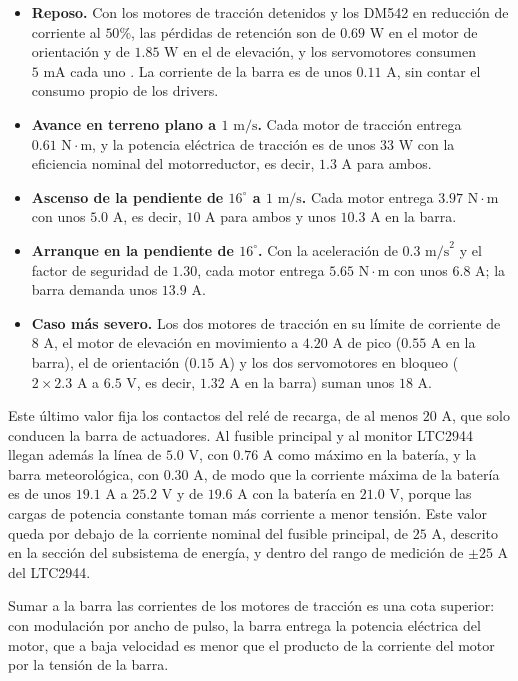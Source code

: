 \documentclass[../../General.tex]{subfiles}
\begin{document}
\begin{itemize}
    \item \textbf{Reposo.} Con los motores de tracción detenidos y los DM542 en reducción de corriente al $50\%$, las pérdidas de retención son de $0.69\text{ W}$ en el motor de orientación y de $1.85\text{ W}$ en el de elevación, y los servomotores consumen $5\text{ mA}$ cada uno \citep{dsservo_rds3225}. La corriente de la barra es de unos $0.11\text{ A}$, sin contar el consumo propio de los drivers.
    \item \textbf{Avance en terreno plano a $1\text{ m/s}$.} Cada motor de tracción entrega $0.61\text{ N}\cdot\text{m}$, y la potencia eléctrica de tracción es de unos $33\text{ W}$ con la eficiencia nominal del motorreductor, es decir, $1.3\text{ A}$ para ambos.
    \item \textbf{Ascenso de la pendiente de $16^\circ$ a $1\text{ m/s}$.} Cada motor entrega $3.97\text{ N}\cdot\text{m}$ con unos $5.0\text{ A}$, es decir, $10\text{ A}$ para ambos y unos $10.3\text{ A}$ en la barra.
    \item \textbf{Arranque en la pendiente de $16^\circ$.} Con la aceleración de $0.3\text{ m/s}^2$ y el factor de seguridad de $1.30$, cada motor entrega $5.65\text{ N}\cdot\text{m}$ con unos $6.8\text{ A}$; la barra demanda unos $13.9\text{ A}$.
    \item \textbf{Caso más severo.} Los dos motores de tracción en su límite de corriente de $8\text{ A}$, el motor de elevación en movimiento a $4.20\text{ A}$ de pico ($0.55\text{ A}$ en la barra), el de orientación ($0.15\text{ A}$) y los dos servomotores en bloqueo ($2 \times 2.3\text{ A}$ a $6.5\text{ V}$, es decir, $1.32\text{ A}$ en la barra) suman unos $18\text{ A}$.
\end{itemize}

Este último valor fija los contactos del relé de recarga, de al menos $20\text{ A}$, que solo conducen la barra de actuadores. Al fusible principal y al monitor LTC2944 llegan además la línea de $5.0\text{ V}$, con $0.76\text{ A}$ como máximo en la batería, y la barra meteorológica, con $0.30\text{ A}$, de modo que la corriente máxima de la batería es de unos $19.1\text{ A}$ a $25.2\text{ V}$ y de $19.6\text{ A}$ con la batería en $21.0\text{ V}$, porque las cargas de potencia constante toman más corriente a menor tensión. Este valor queda por debajo de la corriente nominal del fusible principal, de $25\text{ A}$, descrito en la sección del subsistema de energía, y dentro del rango de medición de $\pm 25\text{ A}$ del LTC2944.

Sumar a la barra las corrientes de los motores de tracción es una cota superior: con modulación por ancho de pulso, la barra entrega la potencia eléctrica del motor, que a baja velocidad es menor que el producto de la corriente del motor por la tensión de la barra.
\end{document}
